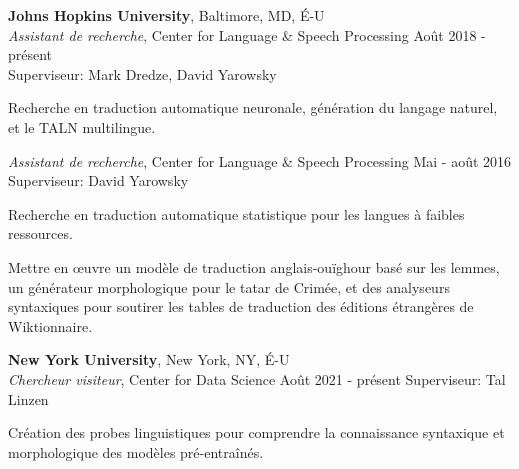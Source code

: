 \documentclass[10pt]{article}
\newcommand{\halfblankline}{\quad\vspace{-0.5\baselineskip}\pagebreak[3]}
\begin{document}
	{\textbf{Johns Hopkins University}},
	Baltimore, MD, É-U\\
		\textit{Assistant de recherche}, Center for Language \& Speech Processing
		\hfill Août 2018 - présent\\
		Superviseur: Mark Dredze, David Yarowsky
		\begin{innerlist}
			\item Recherche en traduction automatique neuronale, génération du langage naturel, et le TALN multilingue.
		\end{innerlist}

		\halfblankline

		\textit{Assistant de recherche}, Center for Language \& Speech Processing%
		\hfill Mai - août 2016\\
		Superviseur: David Yarowsky
		\begin{innerlist}
			\item Recherche en traduction automatique statistique pour les langues à faibles ressources.
			\item Mettre en œuvre un modèle de traduction anglais-ouïghour basé sur les lemmes, un générateur morphologique pour le tatar de Crimée, et des analyseurs syntaxiques pour soutirer les tables de traduction des éditions étrangères de Wiktionnaire.
		\end{innerlist}

	\halfblankline
	
	{\textbf{New York University}},
	New York, NY, É-U\\
	\textit{Chercheur visiteur}, Center for Data Science
	\hfill Août 2021 - présent
	Superviseur: Tal Linzen
	\begin{innerlist}
		\item Création des probes linguistiques pour comprendre la connaissance syntaxique et morphologique des modèles pré-entraînés.
	\end{innerlist}

	\halfblankline

\end{document}
